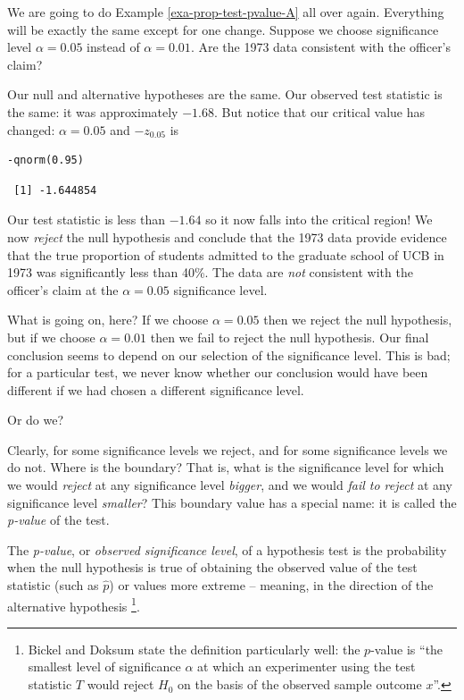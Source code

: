 \documentclass[captions=tableheading]{scrbook}
\begin{document}
\begin{example}
We are going to do Example \ref{exa-prop-test-pvalue-A} all over again. Everything will be exactly the same except for one change. Suppose we choose significance level \(\alpha=0.05\) instead of \(\alpha=0.01\). Are the 1973 data consistent with the officer's claim?

Our null and alternative hypotheses are the same. Our observed test statistic is the same: it was approximately \(-1.68\). But notice that our critical value has changed: \(\alpha=0.05\) and \(-z_{0.05}\) is 
\end{example}

\begin{verbatim}
-qnorm(0.95)
\end{verbatim}

\begin{verbatim}
 [1] -1.644854
\end{verbatim}

Our test statistic is less than \(-1.64\) so it now falls into the critical region! We now \emph{reject} the null hypothesis and conclude that the 1973 data provide evidence that the true proportion of students admitted to the graduate school of UCB in 1973 was significantly less than 40\%. The data are \emph{not} consistent with the officer's claim at the \(\alpha=0.05\) significance level.

What is going on, here? If we choose \(\alpha=0.05\) then we reject the null hypothesis, but if we choose \(\alpha=0.01\) then we fail to reject the null hypothesis. Our final conclusion seems to depend on our selection of the significance level. This is bad; for a particular test, we never know whether our conclusion would have been different if we had chosen a different significance level. 

Or do we?

Clearly, for some significance levels we reject, and for some significance levels we do not. Where is the boundary? That is, what is the significance level for which we would \emph{reject} at any significance level \emph{bigger}, and we would \emph{fail to reject} at any significance level \emph{smaller}? This boundary value has a special name: it is called the \emph{p-value} of the test.

\begin{defn}
The \emph{p-value}, or \emph{observed significance level}, of a hypothesis test is the probability when the null hypothesis is true of obtaining the observed value of the test statistic (such as \(\hat{p}\)) or values more extreme -- meaning, in the direction of the alternative hypothesis
\footnote{Bickel and Doksum \cite{Bickel2001} state the definition particularly well: the \(p\)-value is ``the smallest level of significance \(\alpha\) at which an experimenter using the test statistic \(T\) would reject \(H_{0}\) on the basis of the observed sample outcome \(x\)''.}. 
\end{defn}
\end{document}
